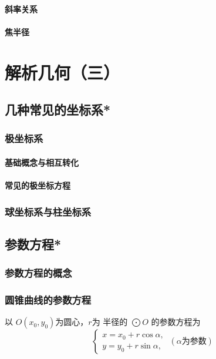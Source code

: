 \subsubsection{斜率关系}
\clearpage
\subsubsection{焦半径}



\chapter{解析几何（三）}
\clearpage
\section{几种常见的坐标系*}
\subsection{极坐标系}
\subsubsection{基础概念与相互转化}
\clearpage
\subsubsection{常见的极坐标方程}
\clearpage
\subsection{球坐标系与柱坐标系}
\clearpage



\section{参数方程*}
\subsection{参数方程的概念}
\clearpage
\subsection{圆锥曲线的参数方程}
\begin{theorem}[圆的参数方程]
    以 \( O(x_0, y_0) \)为圆心，\(r\)为 半径的 \( \bigodot O  \) 的参数方程为
    \[\left\{
    \begin{gathered}
        x = x_0 + r \cos \alpha, \\
        y = y_0 + r \sin \alpha,
    \end{gathered}\right.
    \ (\alpha\text{为参数})
    \]
\end{theorem}


